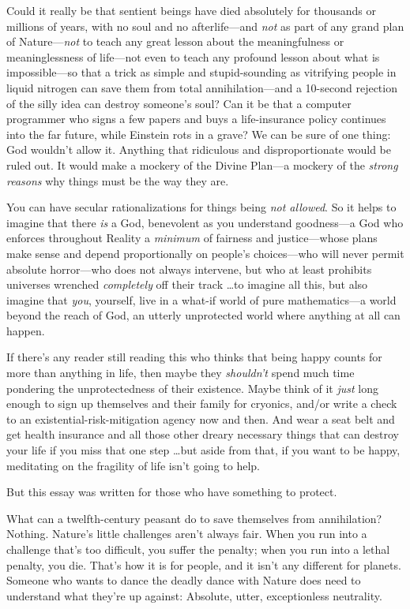 {
 Could it really be that sentient beings have died absolutely for
thousands or millions of years, with no soul and no afterlife---and
\textit{not} as part of any grand plan of Nature---\textit{not} to
teach any great lesson about the meaningfulness or meaninglessness of
life---not even to teach any profound lesson about what is
impossible---so that a trick as simple and stupid-sounding as
vitrifying people in liquid nitrogen can save them from total
annihilation---and a 10-second rejection of the silly idea can destroy
someone's soul? Can it be that a computer programmer
who signs a few papers and buys a life-insurance policy continues into
the far future, while Einstein rots in a grave? We can be sure of one
thing: God wouldn't allow it. Anything that ridiculous
and disproportionate would be ruled out. It would make a mockery of the
Divine Plan---a mockery of the \textit{strong reasons} why things must
be the way they are.}

{
 You can have secular rationalizations for things being \textit{not
allowed}. So it helps to imagine that there \textit{is} a God,
benevolent as you understand goodness---a God who enforces throughout
Reality a \textit{minimum} of fairness and justice---whose plans make
sense and depend proportionally on people's
choices---who will never permit absolute horror---who does not always
intervene, but who at least prohibits universes wrenched
\textit{completely} off their track \ldots to imagine all this, but also
imagine that \textit{you}, yourself, live in a what-if world of pure
mathematics---a world beyond the reach of God, an utterly unprotected
world where anything at all can happen.}

{
 If there's any reader still reading this who
thinks that being happy counts for more than anything in life, then
maybe they \textit{shouldn't} spend much time pondering
the unprotectedness of their existence. Maybe think of it \textit{just}
long enough to sign up themselves and their family for cryonics, and/or
write a check to an existential-risk-mitigation agency now and then.
And wear a seat belt and get health insurance and all those other
dreary necessary things that can destroy your life if you miss that one
step \ldots but aside from that, if you want to be happy, meditating on
the fragility of life isn't going to help.}

{
 But this essay was written for those who have something to
protect.}

{
 What can a twelfth-century peasant do to save themselves from
annihilation? Nothing. Nature's little challenges
aren't always fair. When you run into a challenge
that's too difficult, you suffer the penalty; when you
run into a lethal penalty, you die. That's how it is
for people, and it isn't any different for planets.
Someone who wants to dance the deadly dance with Nature does need to
understand what they're up against: Absolute, utter,
exceptionless neutrality.}

